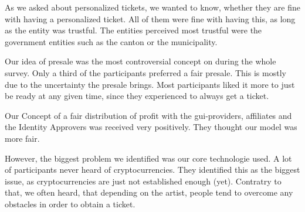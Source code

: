 As we asked about personalized tickets, we wanted to know, whether they are fine with having a personalized ticket. All of them were fine with having this, as long as the entity was trustful. The entities perceived most trustful were the government entities such as the canton or the municipality. 

Our idea of presale was the most controversial concept on during the whole survey. Only a third of the participants preferred a fair presale. This is mostly due to the uncertainty the presale brings. Most participants liked it more to just be ready at any given time, since they experienced to always get a ticket. 

Our Concept of a fair distribution of profit with the gui-providers, affiliates and the Identity Approvers was received very positively. They thought our model was more fair. 

However, the biggest problem we identified was our core technologie used. A lot of participants never heard of cryptocurrencies. They identified this as the biggest issue, as cryptocurrencies are just not established enough (yet). Contratry to that, we often heard, that depending on the artist, people tend to overcome any obstacles in order to obtain a ticket.




